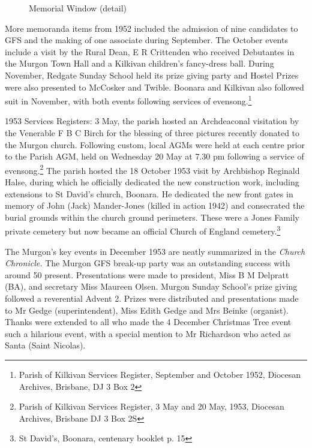 \begin{figure}
\begin{center}
\caption{Memorial Window (detail)}
\end{center}
\end{figure}




More memoranda items from 1952 included the admission of nine candidates to GFS and the making of one associate during September. The October events include a visit by the Rural Dean, E R Crittenden who received Debutantes in the Murgon Town Hall and a Kilkivan children's fancy-dress ball. During November, Redgate Sunday School held its prize giving party and Hostel Prizes were also presented to McCosker and Twible. Boonara and Kilkivan also followed suit in November, with both events following services of evensong.\footnote{Parish of Kilkivan Services Register, September and October 1952, Diocesan Archives, Brisbane, DJ 3 Box 2}


1953 Services Registers: 3 May, the parish hosted an Archdeaconal visitation by the Venerable F B C Birch for the blessing of three pictures recently donated to the Murgon church. Following custom, local AGMs were held at each centre prior to the Parish AGM, held on Wednesday 20 May at 7.30 pm following a service of evensong.\footnote{Parish of Kilkivan Services Register, 3 May and 20 May, 1953, Diocesan Archives, Brisbane DJ 3 Box 2S} The parish hosted the 18 October 1953 visit by Archbishop Reginald Halse, during which he officially dedicated the new construction work, including extensions to St David's church, Boonara. He dedicated the new front gates in memory of John (Jack) Mander-Jones (killed in action 1942) and consecrated the burial grounds within the church ground perimeters. These were a Jones Family private cemetery but now became an official Church of England cemetery.\footnote{St David's, Boonara, centenary booklet p. 15}


The Murgon's key events in December 1953 are neatly summarized in the \emph{Church Chronicle.} The Murgon GFS break-up party was an outstanding success with around 50 present. Presentations were made to president, Miss B M Delpratt (BA), and secretary Miss Maureen Olsen. Murgon Sunday School's prize giving followed a reverential Advent 2. Prizes were distributed and presentations made to Mr Gedge (superintendent), Miss Edith Gedge and Mrs Beinke (organist). Thanks were extended to all who made the 4 December Christmas Tree event such a hilarious event, with a special mention to Mr Richardson who acted as Santa (Saint Nicolas).



